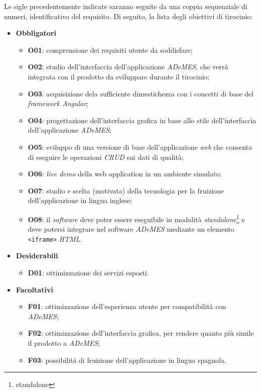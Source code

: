 Le sigle precedentemente indicate saranno seguite da una coppia sequenziale di numeri, identificativo del requisito.
Di seguito, la lista degli obiettivi di tirocinio:
\begin{itemize}
    \item \textbf{Obbligatori}
        \begin{itemize}
            \item \textbf{O01}: comprensione dei requisiti utente da soddisfare;
            \item \textbf{O02}: studio dell'interfaccia dell'applicazione \textit{ADeMES}, che verrà integrata con il prodotto da sviluppare durante il tirocinio;
            \item \textbf{O03}: acquisizione dela sufficiente dimestichezza con i concetti di base del \textit{framework Angular};
            \item \textbf{O04}: progettazione dell'interfaccia grafica in base allo stile dell'interfaccia dell'applicazione \textit{ADeMES};
            \item \textbf{O05}: sviluppo di una versione di base dell'applicazione \textit{web} che consenta di eseguire le operazioni \textit{CRUD} sui dati di qualità;  
            \item \textbf{O06}: \textit{live demo} della web application in un ambiente simulato;
            \item \textbf{O07}: studio e scelta (motivata) della tecnologia per la fruizione dell'applicazione in lingua inglese;
            \item \textbf{O08}: il \textit{software} deve poter essere eseguibile in modalità \textit{standalone}\footnote{\gls{standalone}} e deve potersi integrare nel software \textit{ADeMES} mediante un elemento \texttt{<iframe>} \textit{HTML}.
        \end{itemize}
    \item \textbf{Desiderabili}
        \begin{itemize}
            \item \textbf{D01}: ottimizzazione dei servizi  esposti.
        \end{itemize}
    \item \textbf{Facoltativi}
        \begin{itemize}
            \item \textbf{F01}: ottimizzazione dell'esperienza utente per compatibilità con \textit{ADeMES};
            \item \textbf{F02}: ottimizzazione dell'interfaccia grafica, per rendere quanto più simile il prodotto a \textit{ADeMES};
            \item \textbf{F03}: possibilità di fruizione dell'applicazione in lingua spagnola.
        \end{itemize}
\end{itemize}



